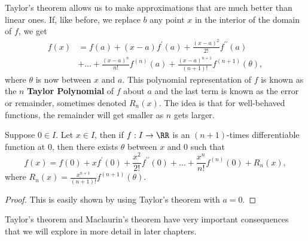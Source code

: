 \documentclass[../real_analysis.tex]{subfiles}
\begin{document}
        Taylor's theorem allows us to make approximations that are much better than linear ones. If, like before, we replace $b$ any point $x$ in the interior of the domain of $f$, we get
        \begin{align*}
            f(x)&=f(a)+(x-a)f^\prime(a)+\frac{(x-a)^2}{2!}f^{\prime\prime}(a)\\
            &+\dots+\frac{(x-
            a)^n}{n!}f^{(n)}(a)+\frac{(x-a)^{n+1}}{(n+1)!}f^{(n+1)}(\theta),
        \end{align*}
        where $\theta$ is now between $x$ and $a$. This polynomial representation of $f$ is known as the $n$ \textbf{Taylor Polynomial} of $f$ about $a$ and the last term is known as the error or remainder, sometimes denoted $R_n(x)$. The idea is that for well-behaved functions, the remainder will get smaller as $n$ gets larger.
        \begin{corollary}
            Suppose $0\in I$. Let $x\in I$, then if $f:I\to\RR$ is an $(n+1)$-times differentiable function at 0, then there exists $\theta$ between $x$ and 0 such that
            \begin{equation*}
                f(x)=f(0)+xf^\prime(0)+\frac{x^2}{2!}f^{\prime\prime}(0)+\dots+\frac{x^n}{n!}f^{(n)}(0)+R_n(x),
            \end{equation*}
            where $R_n(x)=\frac{x^{n+1}}{(n+1)!}f^{(n+1)}(\theta)$.
        \end{corollary}
        \begin{proof}
            This is easily shown by using Taylor's theorem with $a=0$.
        \end{proof}
        Taylor's theorem and Maclaurin's theorem have very important consequences that we will explore in more detail in later chapters.
\end{document}
